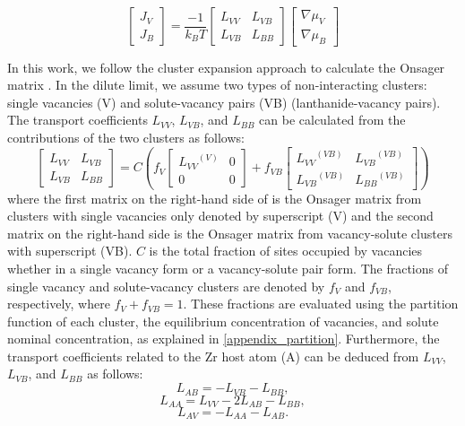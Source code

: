 \documentclass[preprint,12pt]{elsarticle}
\begin{document}
\begin{equation}
\label{matrix_form_onsager}
    \begin{bmatrix}
        J_V \\
        J_B 
    \end{bmatrix}=\frac{-1}{k_B T}
    \begin{bmatrix}
    L_{VV} & L_{VB} \\
    L_{VB} & L_{BB}
    \end{bmatrix}
        \begin{bmatrix}
        \nabla\mu_V \\
        \nabla\mu_B
    \end{bmatrix}
\end{equation}


In this work, we follow the cluster expansion approach to calculate the Onsager matrix \cite{messina_solute_2020, schuler_kineclue_2020}. In the dilute limit, we assume two types of non-interacting clusters: single vacancies (V) and solute-vacancy pairs (VB) (lanthanide-vacancy pairs). The transport coefficients $L_{VV}$, $L_{VB}$, and $L_{BB}$ can be calculated from the contributions of the two clusters as follows:
\begin{equation}
\label{eq_cluster_exp}
    \begin{bmatrix}
    L_{VV} & L_{VB} \\
    L_{VB} & L_{BB}
    \end{bmatrix}
    =
    C (
    f_V 
    \begin{bmatrix}
    {L_{VV}}^{(V)} & 0 \\
    0 & 0 
    \end{bmatrix}
    + f_{VB}
    \begin{bmatrix}
    {L_{VV}}^{(VB)} & {L_{VB}}^{(VB)} \\
    {L_{VB}}^{(VB)} & {L_{BB}}^{(VB)}
    \end{bmatrix}
    )
\end{equation}
where the first matrix on the right-hand side of  is the Onsager matrix from clusters with single vacancies only denoted by superscript (V) and the second matrix on the right-hand side is the Onsager matrix from vacancy-solute clusters with superscript (VB). $C$ is the total fraction of sites occupied by vacancies whether in a single vacancy form or a vacancy-solute pair form. The fractions of single vacancy and solute-vacancy clusters are denoted by $f_V$ and $f_{VB}$, respectively, where $f_V + f_{VB} = 1$. These fractions are evaluated using the partition function of each cluster, the equilibrium concentration of vacancies, and solute nominal concentration, as explained in \ref{appendix_partition}. Furthermore, the transport coefficients related to the Zr host atom (A) can be deduced from $L_{VV}$, $L_{VB}$, and $L_{BB}$ as follows:
\begin{equation}
    L_{AB} = -L_{VB} - L_{BB},
\end{equation}
\begin{equation}
    L_{AA} = L_{VV} - 2L_{AB} - L_{BB},
\end{equation}
\begin{equation}
    L_{AV} = -L_{AA} - L_{AB}.
\end{equation}
\end{document}
